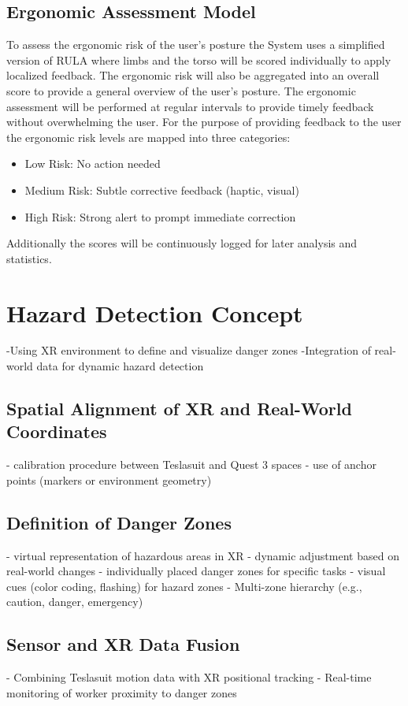 \subsection{Ergonomic Assessment Model}
To assess the ergonomic risk of the user's posture the System uses a simplified version of RULA where limbs and the torso will be scored individually to apply localized feedback. The ergonomic risk will also be aggregated into an overall score to provide a general overview of the user's posture. The ergonomic assessment will be performed at regular intervals to provide timely feedback without overwhelming the user.
For the purpose of providing feedback to the user the ergonomic risk levels are mapped into three categories:
\begin{itemize}
    \item Low Risk: No action needed
    \item Medium Risk: Subtle corrective feedback (haptic, visual)
    \item High Risk: Strong alert to prompt immediate correction
\end{itemize}
Additionally the scores will be continuously logged for later analysis and statistics.

\section{Hazard Detection Concept}

-Using XR environment to define and visualize danger zones
-Integration of real-world data for dynamic hazard detection

\subsection{Spatial Alignment of XR and Real-World Coordinates}
- calibration procedure between Teslasuit and Quest 3 spaces
- use of anchor points (markers or environment geometry)

\subsection{Definition of Danger Zones}
- virtual representation of hazardous areas in XR
- dynamic adjustment based on real-world changes
- individually placed danger zones for specific tasks
- visual cues (color coding, flashing) for hazard zones
- Multi-zone hierarchy (e.g., caution, danger, emergency)

\subsection{Sensor and XR Data Fusion}
- Combining Teslasuit motion data with XR positional tracking
- Real-time monitoring of worker proximity to danger zones


